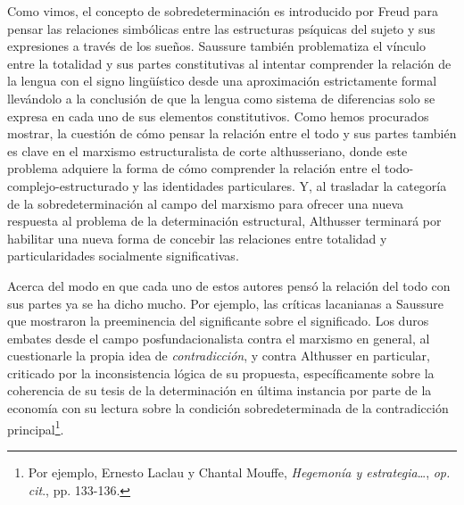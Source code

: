 Como vimos, el concepto de sobredeterminación es introducido por Freud
para pensar las relaciones simbólicas entre las estructuras psíquicas
del sujeto y sus expresiones a través de los sueños. Saussure también
problematiza el vínculo entre la totalidad y sus partes constitutivas al
intentar comprender la relación de la lengua con el signo lingüístico
desde una aproximación estrictamente formal llevándolo a la conclusión
de que la lengua como sistema de diferencias solo se expresa en cada uno
de sus elementos constitutivos. Como hemos procurados mostrar, la
cuestión de cómo pensar la relación entre el todo y sus partes también
es clave en el marxismo estructuralista de corte althusseriano, donde
este problema adquiere la forma de cómo comprender la relación entre el
todo-complejo-estructurado y las identidades particulares. Y, al
trasladar la categoría de la sobredeterminación al campo del marxismo
para ofrecer una nueva respuesta al problema de la determinación
estructural, Althusser terminará por habilitar una nueva forma de
concebir las relaciones entre totalidad y particularidades socialmente
significativas.

Acerca del modo en que cada uno de estos autores pensó la relación del
todo con sus partes ya se ha dicho mucho. Por ejemplo, las críticas
lacanianas a Saussure que mostraron la preeminencia del significante
sobre el significado. Los duros embates desde el campo
posfundacionalista contra el marxismo en general, al cuestionarle la
propia idea de \emph{contradicción}, y contra Althusser en particular,
criticado por la inconsistencia lógica de su propuesta, específicamente
sobre la coherencia de su tesis de la determinación en última instancia
por parte de la economía con su lectura sobre la condición
sobredeterminada de la contradicción principal\footnote{Por ejemplo,
  Ernesto Laclau y Chantal Mouffe, \emph{Hegemonía y estrategia}\ldots,
  \emph{op. cit}., pp. 133-136.}.

